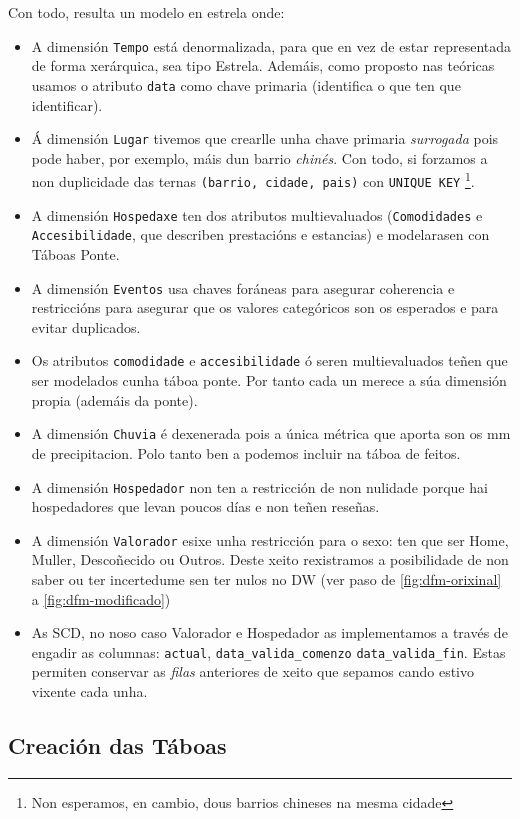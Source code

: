 \documentclass[12pt,a4paper]{article}
\begin{document}
Con todo, resulta un modelo en estrela onde:
\begin{itemize}
	\item A dimensión \texttt{Tempo} está denormalizada, para que en vez de estar representada de forma xerárquica, sea tipo Estrela. Ademáis, como proposto nas teóricas usamos o atributo \texttt{data} como chave primaria (identifica o que ten que identificar).
	\item Á dimensión \texttt{Lugar} tivemos que crearlle unha chave primaria \emph{surrogada} pois pode haber, por exemplo, máis dun barrio \emph{chinés}. Con todo, si forzamos a non duplicidade das ternas \texttt{(barrio, cidade, pais)} con \texttt{UNIQUE KEY} \footnote{Non esperamos, en cambio, dous barrios chineses na mesma cidade}.
	\item A dimensión \texttt{Hospedaxe} ten dos atributos multievaluados (\texttt{Comodidades} e \texttt{Accesibilidade}, que describen prestacións e estancias) e modelarasen con Táboas Ponte.
	\item A dimensión \texttt{Eventos} usa chaves foráneas para asegurar coherencia e restriccións para asegurar que os valores categóricos son os esperados e para evitar duplicados.
	\item Os atributos \texttt{comodidade} e \texttt{accesibilidade} ó seren multievaluados teñen que ser modelados cunha táboa ponte. Por tanto cada un merece a súa dimensión propia (ademáis da ponte).
	\item A dimensión \texttt{Chuvia} é dexenerada pois a única métrica que aporta son os mm de precipitacion. Polo tanto ben a podemos incluir na táboa de feitos.
	\item A dimensión \texttt{Hospedador} non ten a restricción de non nulidade porque hai hospedadores que levan poucos días e non teñen reseñas.
	\item A dimensión \texttt{Valorador} esixe unha restricción para o sexo: ten que ser Home, Muller, Descoñecido ou Outros. Deste xeito rexistramos a posibilidade de non saber ou ter incertedume sen ter nulos no DW (ver paso de \ref{fig:dfm-orixinal} a \ref{fig:dfm-modificado})
	\item As SCD, no noso caso Valorador e Hospedador as implementamos a través de engadir as columnas: \texttt{actual}, \texttt{data\_valida\_comenzo} \texttt{data\_valida\_fin}. Estas permiten conservar as \emph{filas} anteriores de xeito que sepamos cando estivo vixente cada unha.
\end{itemize}


\subsection{Creación das Táboas}
\end{document}
